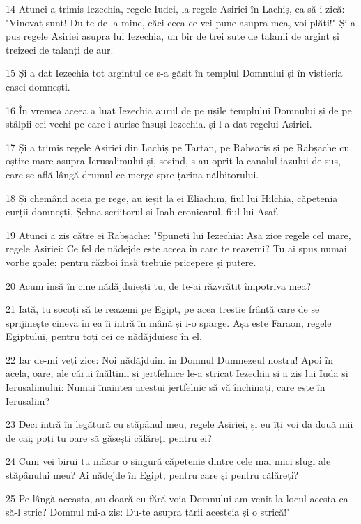 \par 14 Atunci a trimis Iezechia, regele Iudei, la regele Asiriei în Lachiș, ca să-i zică: "Vinovat sunt! Du-te de la mine, căci ceea ce vei pune asupra mea, voi plăti!" Și a pus regele Asiriei asupra lui Iezechia, un bir de trei sute de talanii de argint și treizeci de talanți de aur.
\par 15 Și a dat Iezechia tot argintul ce s-a găsit în templul Domnului și în vistieria casei domnești.
\par 16 În vremea aceea a luat Iezechia aurul de pe ușile templului Domnului și de pe stâlpii cei vechi pe care-i aurise însuși Iezechia. și l-a dat regelui Asiriei.
\par 17 Și a trimis regele Asiriei din Lachiș pe Tartan, pe Rabsaris și pe Rabșache cu oștire mare asupra Ierusalimului și, sosind, s-au oprit la canalul iazului de sus, care se află lângă drumul ce merge spre țarina nălbitorului.
\par 18 Și chemând aceia pe rege, au ieșit la ei Eliachim, fiul lui Hilchia, căpetenia curții domnești, Șebna scriitorul și Ioah cronicarul, fiul lui Asaf.
\par 19 Atunci a zis către ei Rabșache: "Spuneți lui Iezechia: Așa zice regele cel mare, regele Asiriei: Ce fel de nădejde este aceea în care te reazemi? Tu ai spus numai vorbe goale; pentru război însă trebuie pricepere și putere.
\par 20 Acum însă în cine nădăjduiești tu, de te-ai răzvrătit împotriva mea?
\par 21 Iată, tu socoți să te reazemi pe Egipt, pe acea trestie frântă care de se sprijinește cineva în ea îi intră în mână și i-o sparge. Așa este Faraon, regele Egiptului, pentru toți cei ce nădăjduiesc în el.
\par 22 Iar de-mi veți zice: Noi nădăjduim în Domnul Dumnezeul nostru! Apoi în acela, oare, ale cărui înălțimi și jertfelnice le-a stricat Iezechia și a zis lui Iuda și Ierusalimului: Numai înaintea acestui jertfelnic să vă închinați, care este în Ierusalim?
\par 23 Deci intră în legătură cu stăpânul meu, regele Asiriei, și eu îți voi da două mii de cai; poți tu oare să găsești călăreți pentru ei?
\par 24 Cum vei birui tu măcar o singură căpetenie dintre cele mai mici slugi ale stăpânului meu? Ai nădejde în Egipt, pentru care și pentru călăreți?
\par 25 Pe lângă aceasta, au doară eu fără voia Domnului am venit la locul acesta ca să-l stric? Domnul mi-a zis: Du-te asupra țării acesteia și o strică!"
